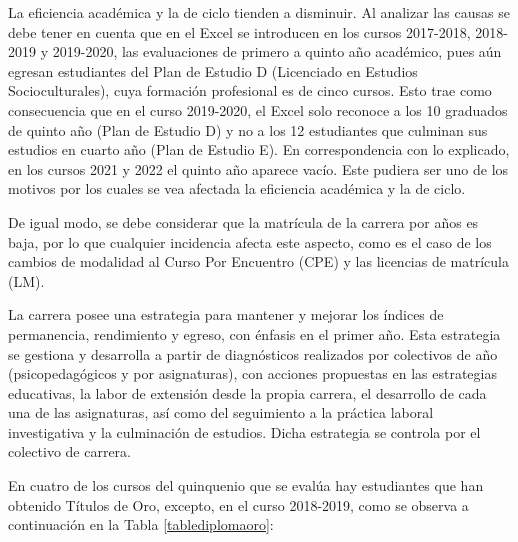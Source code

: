 La eficiencia académica y la de ciclo tienden a disminuir. Al analizar las causas se debe tener en cuenta que en el Excel se introducen en los cursos 2017-2018, 2018-2019 y 2019-2020, las evaluaciones de primero a quinto año académico, pues aún egresan estudiantes del Plan de Estudio D (Licenciado en Estudios Socioculturales), cuya formación profesional es de cinco cursos. Esto trae como consecuencia que en el curso 2019-2020, el Excel solo reconoce a los 10 graduados de quinto año (Plan de Estudio D) y no a los 12 estudiantes que culminan sus estudios en cuarto año (Plan de Estudio E). En correspondencia con lo explicado, en los cursos 2021 y 2022 el quinto año aparece vacío. Este pudiera ser uno de los motivos por los cuales se vea afectada la eficiencia académica y la de ciclo.

De igual modo, se debe considerar que la matrícula de la carrera por años es baja, por lo que cualquier incidencia afecta este aspecto, como es el caso de los cambios de modalidad al Curso Por Encuentro (CPE) y las licencias de matrícula (LM).
  
La carrera posee una estrategia para mantener y mejorar los índices de permanencia, rendimiento y egreso, con énfasis en el primer año. Esta estrategia se gestiona y desarrolla a partir de diagnósticos realizados por colectivos de año (psicopedagógicos y por asignaturas), con acciones propuestas en las estrategias educativas, la labor de extensión desde la propia carrera, el desarrollo de cada una de las asignaturas, así como del seguimiento a la práctica laboral investigativa y la culminación de estudios. Dicha estrategia se controla por el colectivo de carrera.

En cuatro de los cursos del quinquenio que se evalúa hay estudiantes que han obtenido Títulos de Oro, excepto, en el curso 2018-2019, como se observa a continuación  en la Tabla \ref{tablediplomaoro}:

